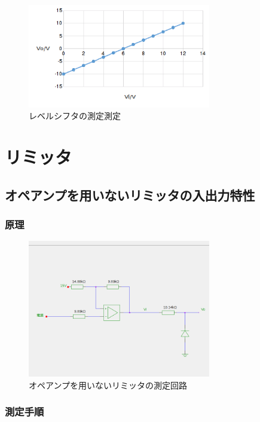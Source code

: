 \documentclass[11pt,a4j]{jsarticle}
\begin{document}
   \begin{figure}[htbp]
  \centering
  \includegraphics[width=8cm,clip]{1_0.png}
  \caption{レベルシフタの測定測定}
  \label{fig:1_0}
 \end{figure}%
   
 \section{リミッタ}
  \subsection{オペアンプを用いないリミッタの入出力特性}
   \subsubsection{原理}
    
    \begin{figure}[htbp]
  \centering
  \includegraphics[width=8cm,clip]{noamp_tokusei.png}
  \caption{オペアンプを用いないリミッタの測定回路}
  \label{fig:noamp_tokusei}
 \end{figure}%
    
   \subsubsection{測定手順}
    
    
\end{document}
